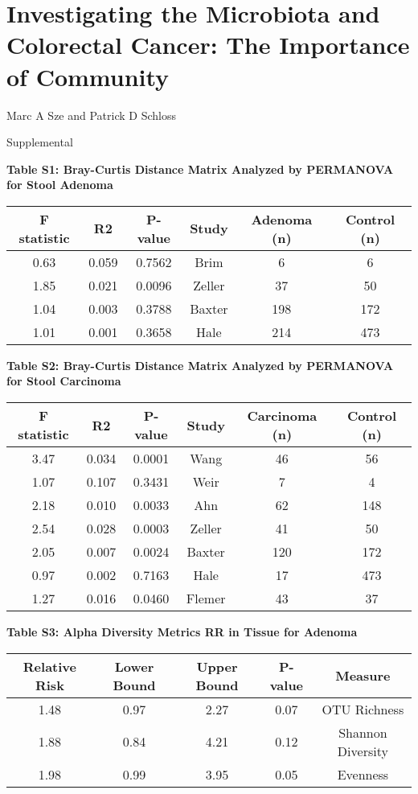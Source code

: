\documentclass[12pt,]{article}
\title{}
\author{}
\date{}
\begin{document}
\section{Investigating the Microbiota and Colorectal Cancer: The
Importance of
Community}\label{investigating-the-microbiota-and-colorectal-cancer-the-importance-of-community}

\vspace{10mm}

\begin{center}
Marc A Sze and Patrick D Schloss

\vspace{10mm}

Supplemental
\end{center}

\newpage

\textbf{Table S1: Bray-Curtis Distance Matrix Analyzed by PERMANOVA for
Stool Adenoma}

\begin{longtable}[]{@{}cccccc@{}}
\toprule
F statistic & R2 & P-value & Study & Adenoma (n) & Control
(n)\tabularnewline
\midrule
\endhead
0.63 & 0.059 & 0.7562 & Brim & 6 & 6\tabularnewline
1.85 & 0.021 & 0.0096 & Zeller & 37 & 50\tabularnewline
1.04 & 0.003 & 0.3788 & Baxter & 198 & 172\tabularnewline
1.01 & 0.001 & 0.3658 & Hale & 214 & 473\tabularnewline
\bottomrule
\end{longtable}

\newpage

\textbf{Table S2: Bray-Curtis Distance Matrix Analyzed by PERMANOVA for
Stool Carcinoma}

\begin{longtable}[]{@{}cccccc@{}}
\toprule
F statistic & R2 & P-value & Study & Carcinoma (n) & Control
(n)\tabularnewline
\midrule
\endhead
3.47 & 0.034 & 0.0001 & Wang & 46 & 56\tabularnewline
1.07 & 0.107 & 0.3431 & Weir & 7 & 4\tabularnewline
2.18 & 0.010 & 0.0033 & Ahn & 62 & 148\tabularnewline
2.54 & 0.028 & 0.0003 & Zeller & 41 & 50\tabularnewline
2.05 & 0.007 & 0.0024 & Baxter & 120 & 172\tabularnewline
0.97 & 0.002 & 0.7163 & Hale & 17 & 473\tabularnewline
1.27 & 0.016 & 0.0460 & Flemer & 43 & 37\tabularnewline
\bottomrule
\end{longtable}

\newpage

\textbf{Table S3: Alpha Diversity Metrics RR in Tissue for Adenoma}

\begin{longtable}[]{@{}ccccc@{}}
\toprule
Relative Risk & Lower Bound & Upper Bound & P-value &
Measure\tabularnewline
\midrule
\endhead
1.48 & 0.97 & 2.27 & 0.07 & OTU Richness\tabularnewline
1.88 & 0.84 & 4.21 & 0.12 & Shannon Diversity\tabularnewline
1.98 & 0.99 & 3.95 & 0.05 & Evenness\tabularnewline
\bottomrule
\end{longtable}
\end{document}
